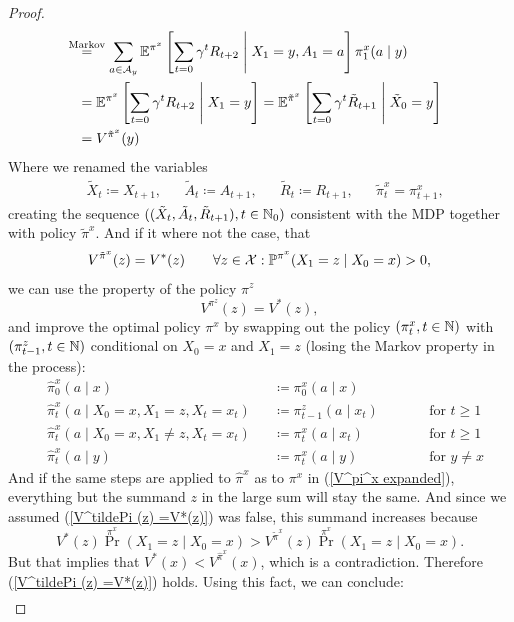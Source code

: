 \begin{proof}
\begin{align}
		&\lxeq{\text{Markov}} \sum_{a\in\cA_y}
		\E^{\pi^x}\left[\sum_{t=0}\gamma^t R_{t+2}\;\middle|\; X_1=y, A_1=a\right]\pi^x_1(a\mid y)\nonumber\\
		&=\E^{\pi^x}\left[\sum_{t=0}\gamma^t R_{t+2}\;\middle|\; X_1=y\right]
		=\E^{\tilde{\pi}^x}\left[\sum_{t=0}\gamma^t \tilde{R}_{t+1}\;\middle|\; \tilde{X}_0=y\right]\nonumber\\
		&=V^{\tilde{\pi}^x}(y)
	\end{align}
	Where we renamed the variables
	\begin{align*}
		&\tilde{X}_t\coloneqq X_{t+1}, &&\tilde{A}_t\coloneqq A_{t+1}, 
		&&\tilde{R}_t\coloneqq R_{t+1}, &&\tilde{\pi}^x_t=\pi^x_{t+1}, 
	\end{align*}
	creating the sequence 
	\(((\tilde{X}_t,\tilde{A}_t, \tilde{R}_{t+1}), t\in\mathbb{N}_0)\) consistent with the MDP together with policy \(\tilde{\pi}^x\). And if it where not the case, that 
	\begin{align}
		V^{\tilde{\pi}^x}(z)=V^*(z) \qquad \forall z\in\mathcal{X}:\mathbb{P}^{\pi^x}(X_1=z\mid X_0=x)>0,
		\label{V^tildePi (z) =V*(z)}
	\end{align}
	we can use the property of the policy \(\pi^z\)
	\[
		V^{\pi^z}(z)=V^*(z),
	\] and improve the optimal policy \(\pi^x\) by swapping out the policy \((\pi^x_t, t\in\mathbb{N}) \) with \((\pi^z_{t-1}, t\in\mathbb{N})\) conditional on \(X_0=x\) and \(X_1=z\) (losing the Markov property in the process): 
	\begin{align*}
			&\hat{\pi}^x_0(a\mid x)&&\coloneqq \pi^x_0(a\mid x) \\
			&\hat{\pi}^x_t(a\mid X_0=x,X_1=z, X_t=x_t)&&\coloneqq \pi^z_{t-1}(a\mid x_t) 
			\qquad && \text{for } t\ge 1\\
			&\hat{\pi}^x_t(a\mid X_0=x, X_1\neq z, X_t=x_t)&&\coloneqq \pi^x_t(a\mid x_t) 
			&& \text{for } t\ge 1 \\
			&\hat{\pi}^x_t(a\mid y)&&\coloneqq \pi^x_t(a\mid y) 
			&& \text{for } y\neq x
	\end{align*}
	And if the same steps are applied to \(\hat{\pi}^x\) as to \(\pi^x\) in (\ref{V^pi^x expanded}), everything but the summand \(z\) in the large sum will stay the same. And since we assumed (\ref{V^tildePi (z) =V*(z)}) was false, this summand increases because
	\[
		V^*(z)\Pr^{\pi^x}(X_1=z\mid X_0=x)> V^{\tilde{\pi}^x}(z) \Pr^{\pi^x}(X_1=z\mid X_0=x).
	\]
	But that implies that \(V^*(x)< V^{\hat{\pi}^x}(x)\), which is a contradiction. Therefore (\ref{V^tildePi (z) =V*(z)}) holds. Using this fact, we can conclude:
	\begin{align*}

\end{align*}
\end{proof}
